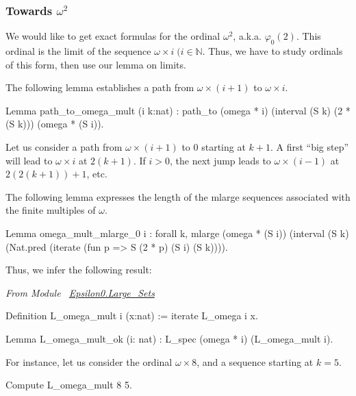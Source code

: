 \documentclass[a4paper]{book}
\begin{document}
\subsubsection{Towards  \texorpdfstring{$\omega^2$}{omega*omega}}

We would like to get exact formulas for the ordinal $\omega^2$, a.k.a.
$\varphi_0(2)$. This ordinal is the limit of the sequence $\omega\times i\;(i \in \mathbb{N}$. Thus, we have to study ordinals of this form, then use 
our lemma on limits.

The following lemma establishes a path from $\omega\times ( i+1)$ to
$\omega \times i$.

\begin{Coqsrc}
Lemma path_to_omega_mult (i k:nat) :
  path_to (omega * i) (interval (S k) (2 * (S k))) (omega * (S i)).
\end{Coqsrc}

Let us consider a path from  $\omega\times(i+1)$ to $0$ starting at $k+1$.
A first ``big step'' will lead to $\omega\times i$ at $2(k+1)$. If $i>0$, the
next jump leads to $\omega\times(i-1)$ at $2(2(k+1))+1$, etc.


The following lemma expresses the length of the mlarge sequences associated with the finite multiples of $\omega$.


\begin{Coqsrc}
Lemma omega_mult_mlarge_0 i  : forall k,
    mlarge  (omega * (S i))
            (interval (S k)
                      (Nat.pred (iterate (fun p =>  S (2 * p)%
                                         (S i)
                                         (S k)))).
\end{Coqsrc}

Thus, we infer the following result:

\emph{From Module~ \href{../src/html/hydras.Epsilon0.Large_Sets.html\#L_omega_mult}{Epsilon0.Large\_Sets}}

\begin{Coqsrc}
Definition L_omega_mult i (x:nat) :=  iterate L_omega i x.

Lemma L_omega_mult_ok (i: nat) :  L_spec (omega * i) (L_omega_mult i).
\end{Coqsrc}

For instance, let us consider the ordinal $\omega\times 8$, and a sequence 
starting at $k=5$.

\begin{Coqsrc}
Compute L_omega_mult 8 5.
\end{Coqsrc}
\end{document}
